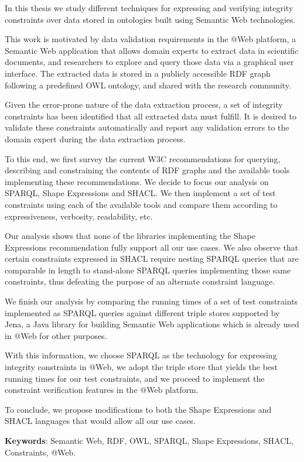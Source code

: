 \documentclass[a4paper, 10pt]{article}
\begin{document}
In this thesis we study different techniques for expressing and verifying
integrity constraints over data stored in ontologies built using Semantic Web
technologies.

This work is motivated by data validation requirements in the @Web platform, a
Semantic Web application that allows domain experts to extract data in
scientific documents, and researchers to explore and query those data via a
graphical user interface. The extracted data is stored in a publicly
accessible RDF graph following a predefined OWL ontology, and shared with the
research community.

Given the error-prone nature of the data extraction process, a set of
integrity constraints has been identified that all extracted data must
fulfill. It is desired to validate these constraints automatically and report
any validation errors to the domain expert during the data extraction process.

To this end, we first survey the current W3C recommendations for querying,
describing and constraining the contents of RDF graphs and the available tools
implementing these recommendations. We decide to focus our analysis on SPARQL,
Shape Expressions and SHACL. We then implement a set of test constraints using
each of the available tools and compare them according to expressiveness,
verbosity, readability, etc.

Our analysis shows that none of the libraries implementing the Shape
Expressions recommendation fully support all our use cases. We also observe
that certain constraints expressed in SHACL require nesting SPARQL queries that
are comparable in length to stand-alone SPARQL queries implementing those same
constraints, thus defeating the purpose of an alternate constraint language.

We finish our analysis by comparing the running times of a set of test
constraints implemented as SPARQL queries against different triple stores
supported by Jena, a Java library for building Semantic Web applications which
is already used in @Web for other purposes.

With this information, we choose SPARQL as the technology for expressing
integrity constraints in @Web, we adopt the triple store that yields the best
running times for our test constraints, and we proceed to implement the
constraint verification features in the @Web platform.

To conclude, we propose modifications to both the Shape Expressions and SHACL
languages that would allow all our use cases.

\textbf{Keywords}: Semantic Web, RDF, OWL, SPARQL, Shape Expressions, SHACL,
Constraints, @Web.
\end{document}
